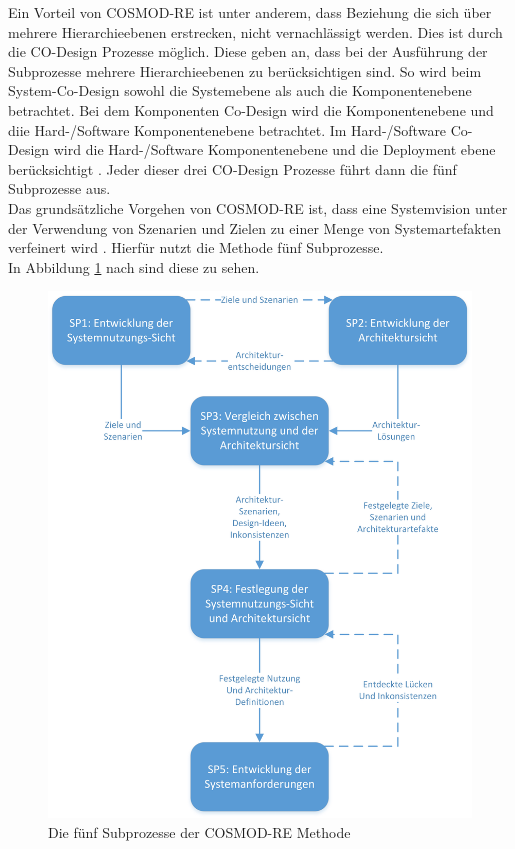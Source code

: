 Ein Vorteil von COSMOD-RE ist unter anderem, dass Beziehung die sich \"uber mehrere Hierarchieebenen erstrecken, nicht vernachl\"assigt werden. Dies ist durch die CO-Design Prozesse m\"oglich. Diese geben an, dass bei der Ausf\"uhrung der Subprozesse mehrere Hierarchieebenen zu ber\"ucksichtigen sind. So wird beim System-Co-Design sowohl die Systemebene als auch die Komponentenebene betrachtet. Bei dem Komponenten Co-Design wird die Komponentenebene und diie Hard-/Software Komponentenebene betrachtet. Im Hard-/Software Co-Design wird die Hard-/Software Komponentenebene und die Deployment ebene ber\"ucksichtigt \cite{Poh02}. Jeder dieser drei CO-Design Prozesse f\"uhrt dann die f\"unf Subprozesse aus.\\ 

Das grunds\"atzliche Vorgehen von COSMOD-RE ist, dass eine Systemvision unter der Verwendung von Szenarien und Zielen zu einer Menge von Systemartefakten verfeinert wird \cite{Poh01}. Hierf\"ur nutzt die Methode f\"unf Subprozesse. \\

In Abbildung \ref{pro5} nach \cite{Poh01} sind diese zu sehen. \\

\begin{figure}[h]
	\centering
	\includegraphics[scale=0.65]{COSMODRE5prozesse.jpg} 
	\caption{Die f\"unf Subprozesse der COSMOD-RE Methode}\label{pro5}
\end{figure}

